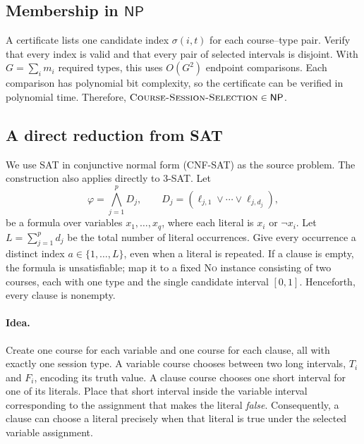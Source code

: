 \documentclass[10pt]{article}
\theoremstyle{definition}
\newcommand{\NO}{\textsc{No}}
\newcommand{\NP}{\mathsf{NP}}
\begin{document}
\subsection{Membership in \texorpdfstring{$\NP$}{NP}}

A certificate lists one candidate index $\sigma(i,t)$ for each course--type
pair. Verify that every index is valid and that every pair of selected
intervals is disjoint. With $G=\sum_i m_i$ required types, this uses
$O(G^2)$ endpoint comparisons. Each comparison has polynomial bit complexity,
so the certificate can be verified in polynomial time. Therefore,
$\textsc{Course-Session-Selection}\in\NP$.

\subsection{A direct reduction from SAT}

We use SAT in conjunctive normal form (\textsc{CNF-SAT}) as the source
problem. The construction also applies directly to \textsc{3-SAT}.
Let
\[
  \varphi=\bigwedge_{j=1}^{p}D_j,
  \qquad D_j=(\ell_{j,1}\lor\cdots\lor\ell_{j,d_j}),
\]
be a formula over variables $x_1,\ldots,x_q$, where each literal is
$x_i$ or $\neg x_i$. Let $L=\sum_{j=1}^{p}d_j$ be the total number
of literal occurrences. Give every occurrence a distinct index
$a\in\{1,\ldots,L\}$, even when a literal is repeated.
If a clause is empty, the formula is unsatisfiable; map it to a fixed
\NO{} instance consisting of two courses, each with one type and the
single candidate interval $[0,1]$. Henceforth, every clause is nonempty.

\paragraph{Idea.}
Create one course for each variable and one course for each clause,
all with exactly one session type. A variable course chooses between
two long intervals, $T_i$ and $F_i$, encoding its truth value.
A clause course chooses one short interval for one of its literals.
Place that short interval inside the variable interval corresponding
to the assignment that makes the literal \emph{false}. Consequently,
a clause can choose a literal precisely when that literal is true
under the selected variable assignment.
\end{document}
